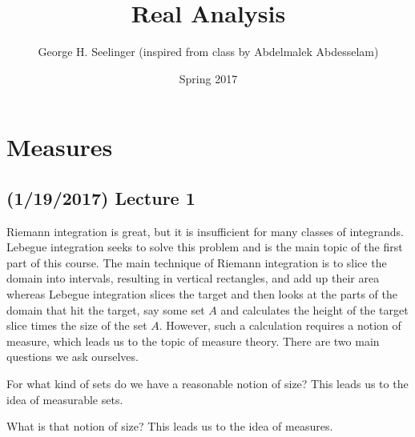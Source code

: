 \documentclass[11pt,leqno,oneside]{amsbook}
\title[Real Analysis]{Real Analysis}
\author{George H. Seelinger (inspired from class by Abdelmalek Abdesselam)}
\date{Spring 2017}
\numberwithin{thm}{section}
\begin{document}
\maketitle
\setcounter{tocdepth}{1}
\tableofcontents
\section{Measures}
\subsection*{(1/19/2017) Lecture 1}
Riemann integration is great, but it is insufficient for many classes
of integrands. Lebegue integration seeks to solve this problem and is
the main topic of the first part of this course. The main technique of
Riemann integration is to slice the domain into intervals, resulting in vertical rectangles, and add up
their area whereas Lebegue integration slices the target and then
looks at the parts of the domain that hit the target, say some set $A$
and calculates the height of the target slice times the size of the set
$A$. However, such a calculation requires a notion of measure, which
leads us to the topic of measure theory. There are two main questions
we ask ourselves.
\begin{thm}[Question]
  For what kind of sets do we have a reasonable notion of size? This
  leads us to the idea of measurable sets.
\end{thm}
\begin{thm}[Question]
  What is that notion of size? This leads us to the idea of measures.
\end{thm}
\end{document}
